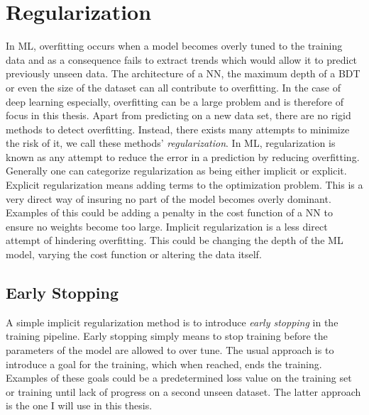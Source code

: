 \section{Regularization}\label{sec:Regularization}
In \ac{ML}, overfitting occurs when a model becomes overly tuned to the training data and as a consequence 
fails to extract trends which would allow it to predict previously unseen data. The architecture of a \ac{NN}, 
the maximum depth of a \ac{BDT} or even the size of the dataset can all contribute to overfitting. In the 
case of deep learning especially, overfitting can be a large problem and is therefore of focus in this thesis. Apart 
from predicting on a new data set, there are no rigid methods to detect overfitting. Instead, there exists many 
attempts to minimize the risk of it, we call these methods' \emph{regularization}. In \ac{ML}, regularization 
is known as any attempt to reduce the error in a prediction by reducing overfitting. Generally one can categorize
regularization as being either implicit or explicit. Explicit regularization means adding terms to the optimization 
problem. This is a very direct way of insuring no part of the model becomes overly dominant. Examples of this 
could be adding a penalty in the cost function of a \ac{NN} to ensure no weights become too large. Implicit
regularization is a less direct attempt of hindering overfitting. This could be changing the depth of the \ac{ML} model,
varying the cost function or altering the data itself.
\subsection{Early Stopping}\label{subsec:EarlyStopping}
A simple implicit regularization method is to introduce \emph{early stopping} in the training pipeline. Early stopping 
simply means to stop training before the parameters of the model are allowed to over tune. The usual approach 
is to introduce a goal for the training, which when reached, ends the training. Examples of these goals could be a 
predetermined loss value on the training set or training until lack of progress on a second unseen dataset. The latter
approach is the one I will use in this thesis. 
